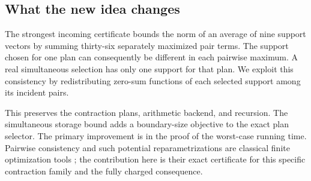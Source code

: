 \subsection{What the new idea changes}

The strongest incoming certificate bounds the norm of an average of nine
support vectors by summing thirty-six separately maximized pair terms.
The support chosen for one plan can consequently be different in each
pairwise maximum. A real simultaneous selection has only one support for
that plan. We exploit this consistency by redistributing zero-sum functions
of each selected support among its incident pairs.

This preserves the contraction plans, arithmetic backend, and recursion.
The simultaneous storage bound adds a boundary-size objective to the exact
plan selector. The primary improvement is in the proof of the
worst-case running time. Pairwise consistency and such potential
reparametrizations are classical finite optimization tools
\cite{wainwright}; the contribution here is their exact certificate for
this specific contraction family and the fully charged consequence.

